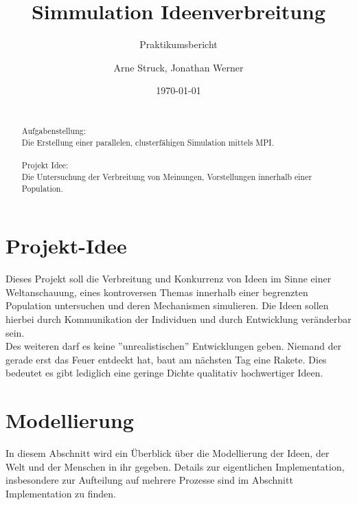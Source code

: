 \title{Simmulation Ideenverbreitung}
\subtitle{Praktikumsbericht}

\author{Arne Struck, Jonathan Werner}

  
\date{\today}

\maketitle


\begin{abstract}
\quad \\
Aufgabenstellung: \\
Die Erstellung einer parallelen, clusterfähigen Simulation mittels MPI. \\ \\
Projekt Idee: \\
Die Untersuchung der Verbreitung von Meinungen, Vorstellungen innerhalb einer Population.
\end{abstract}

\tableofcontents
\newpage
\section{Projekt-Idee}
Dieses Projekt soll die Verbreitung und Konkurrenz von Ideen im Sinne einer Weltanschauung, eines kontroversen Themas innerhalb einer begrenzten Population untersuchen und deren Mechanismen simulieren. 
Die Ideen sollen hierbei durch Kommunikation der Individuen und durch Entwicklung veränderbar sein. \\
Des weiteren darf es keine ''unrealistischen'' Entwicklungen geben. 
Niemand der gerade erst das Feuer entdeckt hat, baut am nächsten Tag eine Rakete. Dies bedeutet es gibt lediglich eine geringe Dichte qualitativ hochwertiger Ideen.

\section{Modellierung}
In diesem Abschnitt wird ein Überblick über die Modellierung der Ideen, der Welt und der Menschen in ihr gegeben. 
Details zur eigentlichen Implementation, insbesondere zur Aufteilung auf mehrere Prozesse sind im Abschnitt Implementation zu finden.
